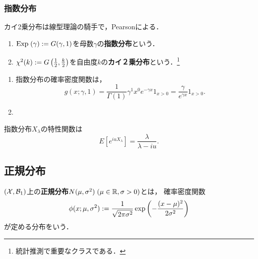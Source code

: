 \documentclass[uplatex,dvipdfmx]{jsreport}
\begin{document}
\subsubsection{指数分布}

\begin{tcolorbox}[colframe=ForestGreen, colback=ForestGreen!10!white,breakable,colbacktitle=ForestGreen!40!white,coltitle=black,fonttitle=\bfseries\sffamily,
title=]
    カイ2乗分布は線型理論の騎手で，Pearsonによる．
\end{tcolorbox}

\begin{definition}\mbox{}\label{def-exponential-distribution}
    \begin{enumerate}
        \item $\mathrm{Exp}\;(\gamma):=G(\gamma,1)$を母数$\gamma$の\textbf{指数分布}という．
        \item $\chi^2(k):=G\left(\frac{1}{2},\frac{k}{2}\right)$を自由度$k$の\textbf{カイ２乗分布}という．\footnote{統計推測で重要なクラスである．}
    \end{enumerate}
\end{definition}

\begin{lemma}[確率密度関数]\mbox{}
    \begin{enumerate}
        \item 指数分布の確率密度関数は，
        \[g(x;\gamma,1)=\frac{1}{\Gamma(1)}\gamma^1x^0e^{-\gamma x}1_{x>0}=\frac{\gamma}{e^{\gamma x}}1_{x>0}.\]
        \item 
    \end{enumerate}
\end{lemma}

\begin{lemma}
    指数分布$X_\lambda$の特性関数は
    \[E[e^{iuX_\lambda}]=\frac{\lambda}{\lambda-iu}.\]
\end{lemma}

\subsection{正規分布}

\begin{definition}
    $(\mathcal{X},\mathcal{B}_1)$上の\textbf{正規分布}$N(\mu,\sigma^2)\;(\mu\in\mathbb{R},\sigma>0)$とは，
    確率密度関数
    \[\phi(x;\mu,\sigma^2):=\frac{1}{\sqrt{2\pi\sigma^2}}\exp\left(-\frac{(x-\mu)^2}{2\sigma^2}\right)\]
    が定める分布をいう．
\end{definition}
\end{document}

